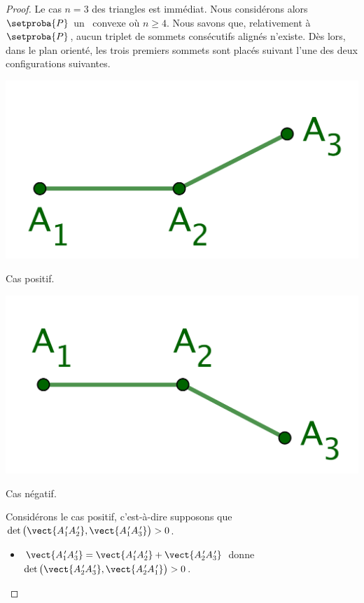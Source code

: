 \begin{proof}
	Le cas $n = 3$ des triangles est immédiat.
	Nous considérons alors $\setproba{P}$ un \ngone\ convexe où  $n \geq 4$.
	Nous savons que, relativement à $\setproba{P}$, aucun triplet de sommets consécutifs alignés n'existe.
	Dès lors, dans le plan orienté, les trois premiers sommets sont placés suivant l'une des deux configurations suivantes. 
    
    \begin{multicols}{2}
        \small\itshape\centering
       	\includegraphics[scale=.45]{content/polygon/at-least-one/conv-det-sign-1.png}
    	    
    	\smallskip
        Cas positif.
        
        \includegraphics[scale=.45]{content/polygon/at-least-one/conv-det-sign-2.png}
    	    
    	\smallskip
        Cas négatif.
    \end{multicols}

    
    \noindent
    Considérons le cas positif, c'est-à-dire supposons que 
    $\det \big( \vect{A^{\,\prime}_1 A^{\,\prime}_2}, \vect{A^{\,\prime}_1 A^{\,\prime}_3} \big) > 0$.
	\begin{itemize}
    	\item $\vect{A^{\,\prime}_1 A^{\,\prime}_3} = \vect{A^{\,\prime}_1 A^{\,\prime}_2} + \vect{A^{\,\prime}_2 A^{\,\prime}_3}$
    	donne
		$\det \big( \vect{A^{\,\prime}_2 A^{\,\prime}_3}, \vect{A^{\,\prime}_2 A^{\,\prime}_1} \big) > 0$.



\end{itemize}
\end{proof}
